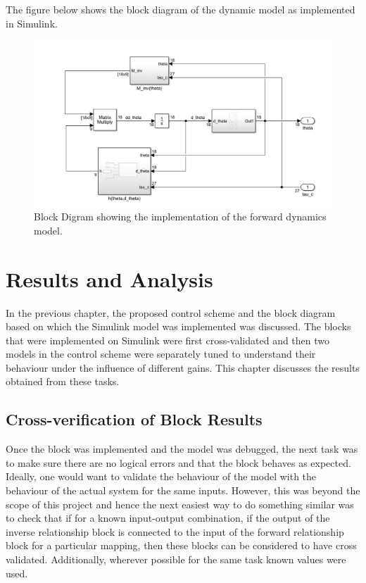 \documentclass[a4paper,12pt]{report}
\begin{document}
The figure below shows the block diagram of the dynamic model as implemented in Simulink.

\begin{figure}[H]
	\centering
	\includegraphics[width=\textwidth]{images/Dynamic-Model_BD.png}
	\caption{Block Digram showing the implementation of the forward dynamics model.}
	\label{dynamic-model-implementation-BD}
\end{figure}

\chapter{Results and Analysis}
\label{result-chapter}
In the previous chapter, the proposed control scheme and the block diagram based on which the Simulink model was implemented was discussed. The blocks that were implemented on Simulink were first cross-validated and then two models in the control scheme were separately tuned to understand their behaviour under the influence of different gains. This chapter discusses the results obtained from these tasks.

\section{Cross-verification of Block Results}
Once the block was implemented and the model was debugged, the next task was to make sure there are no logical errors and that the block behaves as expected. Ideally, one would want to validate the behaviour of the model with the behaviour of the actual system for the same inputs. However, this was beyond the scope of this project and hence the next easiest way to do something similar was to check that if for a known input-output combination, if the output of the inverse relationship block is connected to the input of the forward relationship block for a particular mapping, then these blocks can be considered to have cross validated. Additionally, wherever possible for the same task known values were used.
\end{document}

